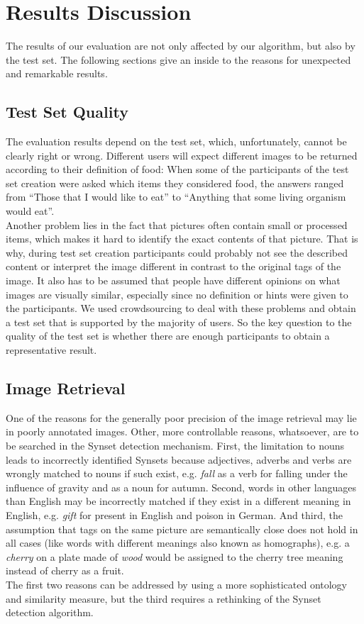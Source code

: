 %
\section{Results Discussion}
\label{sec_discussion}

The results of our evaluation are not only affected by our algorithm, but also by the test set. The following sections give an inside to the reasons for unexpected and remarkable results.

\subsection{Test Set Quality}
The evaluation results depend on the test set, which, unfortunately, cannot be clearly right or wrong. Different users will expect different images to be returned according to their definition of food: When some of the participants of the test set creation were asked which items they considered food, the answers ranged from ``Those that I would like to eat'' to ``Anything that some living organism would eat''. \\
Another problem lies in the fact that pictures often contain small or processed items, which makes it hard to identify the exact contents of that picture. That is why, during test set creation participants could probably not see the described content or interpret the image different in contrast to the original tags of the image.
It also has to be assumed that people have different opinions on what images are visually similar, especially since no definition or hints were given to the participants. We used crowdsourcing to deal with these problems and obtain a test set that is supported by the majority of users. So the key question to the quality of the test set is whether there are enough participants to obtain a representative result.

\subsection{Image Retrieval}
One of the reasons for the generally poor precision of the image retrieval may lie in poorly annotated images.
Other, more controllable reasons, whatsoever, are to be searched in the Synset detection mechanism.
First, the limitation to nouns leads to incorrectly identified Synsets because adjectives, adverbs and verbs are wrongly matched to nouns if such exist, e.g. \emph{fall} as a verb for falling under the influence of gravity and as a noun for autumn.
Second, words in other languages than English may be incorrectly matched if they exist in a different meaning in English, e.g. \emph{gift} for present in English and poison in German.
And third, the assumption that tags on the same picture are semantically close does not hold in all cases (like words with different meanings also known as homographs), e.g. a \emph{cherry} on a plate made of \emph{wood} would be assigned to the cherry tree meaning instead of cherry as a fruit. \\
The first two reasons can be addressed by using a more sophisticated ontology and similarity measure, but the third requires a rethinking of the Synset detection algorithm.

